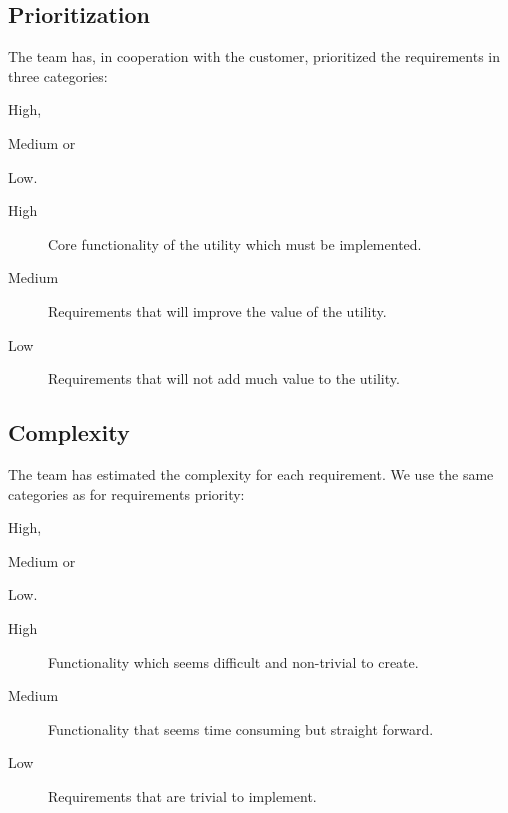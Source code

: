 \subsection{Prioritization}
\label{sec:req:priority}
The team has, in cooperation with the customer, prioritized the requirements
in three categories:
\begin{inparaenum}
	\item High,
	\item Medium or
	\item Low.
\end{inparaenum} 

\begin{description}
	\item[High] Core functionality of the \gls{utility} which must be implemented.
	\item[Medium] Requirements that will improve the value of the \gls{utility}.
	\item[Low] Requirements that will not add much value to the \gls{utility}.
\end{description}

\subsection{Complexity}
\label{sec:req:compl}
The team has estimated the complexity for each requirement. We use the same
categories as for requirements priority:
\begin{inparaenum}
	\item High,
	\item Medium or
	\item Low.
\end{inparaenum} 

\begin{description}
	\item[High] Functionality which seems difficult and non-trivial to create.
	\item[Medium] Functionality that seems time consuming but straight forward.
	\item[Low] Requirements that are trivial to implement.
\end{description}

